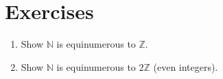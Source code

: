 \documentclass{report}
\newenvironment{proof}{\textbf{\textit{Proof.}}}{\hfill$\square$}
\begin{document}
\newpage
\section*{Exercises}
\begin{enumerate}
    \item Show $\mathbb{N}$ is equinumerous to $\mathbb{Z}$.
    \item Show $\mathbb{N}$ is equinumerous to $2\mathbb{Z}$ (even integers).
\end{enumerate}
\end{document}
